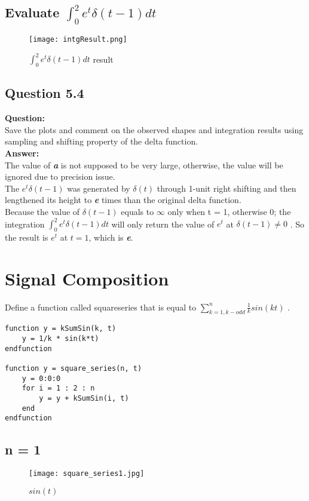 \documentclass[12pt,fleqn]{article}
\begin{document}
\subsection{Evaluate $\int_0^2 e^t\delta(t-1)dt$}
\begin{figure}[H]
\centering
\texttt{[image: intgResult.png]}
\caption{$\int_0^2 e^t \delta(t-1)dt$ result}
\end{figure}

\subsection{Question 5.4}
\textbf{Question:}\\
Save the plots and comment on the observed shapes and integration results using sampling and shifting property of the delta function.\\
\textbf{Answer:}\\
The value of \emph{\textbf{a}} is not supposed to be very large, otherwise, the value will be ignored due to precision issue.\\
The $e^t\delta(t-1)$ was generated by $\delta(t)$ through 1-unit right shifting and then lengthened its height to \emph{\textbf{e}} times than the original delta function.\\
Because the value of $\delta(t-1)$ equals to $\infty$ only when t = 1, otherwise 0; the integration $\int_0^2 e^t\delta(t-1)dt$ will only return the value of $e^t$ at $\delta(t-1)\neq 0$ . So the result is $e^t$ at $t=1$, which is \emph{\textbf{e}}.

\section{Signal Composition}
Define a function called square\underline{}series that is equal to $\sum_{k=1,k-odd}^n\frac{1}{k}sin(kt)$ .
\begin{lstlisting}[frame=single]
function y = kSumSin(k, t)
    y = 1/k * sin(k*t)
endfunction

function y = square_series(n, t)
    y = 0:0:0
    for i = 1 : 2 : n
        y = y + kSumSin(i, t)
    end
endfunction
\end{lstlisting}
\subsection{n = 1}
\begin{figure}[H]
\centering
\texttt{[image: square\_series1.jpg]}
\caption{$sin(t)$}
\end{figure}
\end{document}
